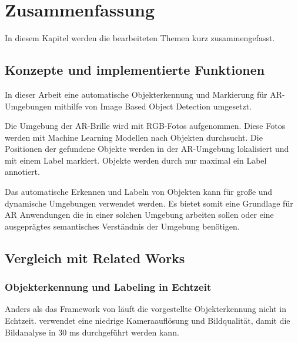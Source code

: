 \section{Zusammenfassung}

In diesem Kapitel werden die bearbeiteten Themen kurz zusammengefasst.

\subsection{Konzepte und implementierte Funktionen}

In dieser Arbeit eine automatische Objekterkennung und Markierung für AR-Umgebungen mithilfe von Image Based Object Detection umgesetzt. 

Die Umgebung der AR-Brille wird mit RGB-Fotos aufgenommen. Diese Fotos werden mit Machine Learning Modellen nach Objekten durchsucht. Die Positionen der gefundene Objekte werden in der AR-Umgebung lokalisiert und mit einem Label markiert. Objekte werden durch nur maximal ein Label annotiert.  

Das automatische Erkennen und Labeln von Objekten kann für große und dynamische Umgebungen verwendet werden. Es bietet somit eine Grundlage für AR Anwendungen die in einer solchen Umgebung arbeiten sollen oder eine ausgeprägtes semantisches Verständnis der Umgebung benötigen.




\subsection{Vergleich mit Related Works}
\subsubsection*{Objekterkennung und Labeling in Echtzeit}
Anders als das Framework von \cite{LabelingLanguageLearning} läuft die vorgestellte Objekterkennung nicht in Echtzeit. \cite{LabelingLanguageLearning} verwendet eine niedrige Kameraauflösung und Bildqualität, damit die Bildanalyse in 30 ms durchgeführt werden kann.


